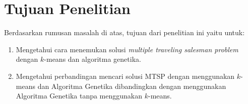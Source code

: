 \section{Tujuan Penelitian}

Berdasarkan rumusan masalah di atas, tujuan dari penelitian ini yaitu untuk:
\begin{enumerate}
	\item Mengetahui cara menemukan solusi \textit{multiple traveling salesman problem} dengan $k$-means dan algoritma genetika.
	\item Mengetahui perbandingan mencari solusi MTSP dengan menggunakan $k$-means dan Algoritma Genetika dibandingkan dengan menggunakan Algoritma Genetika tanpa menggunakan $k$-means.
\end{enumerate}
